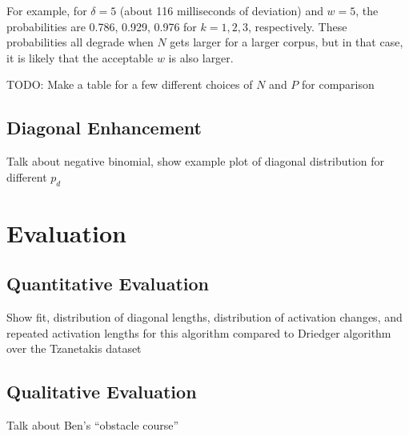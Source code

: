 \documentclass[letterpaper, 12pt]{article}
\begin{document}
For example, for $\delta=5$ (about 116 milliseconds of deviation) and $w = 5$, the probabilities are 0.786, 0.929, 0.976 for $k=1, 2, 3$, respectively.  These probabilities all degrade when $N$ gets larger for a larger corpus, but in that case, it is likely that the acceptable $w$ is also larger.


TODO: Make a table for a few different choices of $N$ and $P$ for comparison


\subsection{Diagonal Enhancement}

Talk about negative binomial, show example plot of diagonal distribution for different $p_d$


\section{Evaluation}

\subsection{Quantitative Evaluation}
Show fit, distribution of diagonal lengths, distribution of activation changes, and repeated activation lengths for this algorithm compared to Driedger algorithm over the Tzanetakis dataset


\subsection{Qualitative Evaluation}

Talk about Ben's ``obstacle course''




\end{document}
